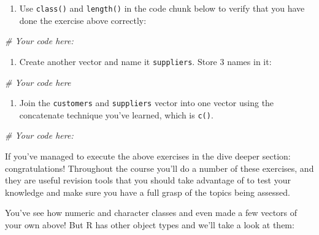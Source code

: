 \documentclass[]{article}
\newenvironment{Shaded}{\begin{snugshade}}{\end{snugshade}}
\newcommand{\CommentTok}[1]{\textcolor[rgb]{0.56,0.35,0.01}{\textit{#1}}}
\providecommand{\tightlist}{%
  \setlength{\itemsep}{0pt}\setlength{\parskip}{0pt}}
\begin{document}
\begin{enumerate}
\def\labelenumi{\arabic{enumi}.}
\setcounter{enumi}{1}
\tightlist
\item
  Use \texttt{class()} and \texttt{length()} in the code chunk below to
  verify that you have done the exercise above correctly:
\end{enumerate}

\begin{Shaded}
\begin{Highlighting}[]
\CommentTok{# Your code here:}
\end{Highlighting}
\end{Shaded}

\begin{enumerate}
\def\labelenumi{\arabic{enumi}.}
\setcounter{enumi}{2}
\tightlist
\item
  Create another vector and name it \texttt{suppliers}. Store 3 names in
  it:
\end{enumerate}

\begin{Shaded}
\begin{Highlighting}[]
\CommentTok{# Your code here}
\end{Highlighting}
\end{Shaded}

\begin{enumerate}
\def\labelenumi{\arabic{enumi}.}
\setcounter{enumi}{3}
\tightlist
\item
  Join the \texttt{customers} and \texttt{suppliers} vector into one
  vector using the concatenate technique you've learned, which is
  \texttt{c()}.
\end{enumerate}

\begin{Shaded}
\begin{Highlighting}[]
\CommentTok{# Your code here:}
\end{Highlighting}
\end{Shaded}

If you've managed to execute the above exercises in the dive deeper
section: congratulations! Throughout the course you'll do a number of
these exercises, and they are useful revision tools that you should take
advantage of to test your knowledge and make sure you have a full grasp
of the topics being assessed.

You've see how numeric and character classes and even made a few vectors
of your own above! But R has other object types and we'll take a look at
them:
\end{document}
